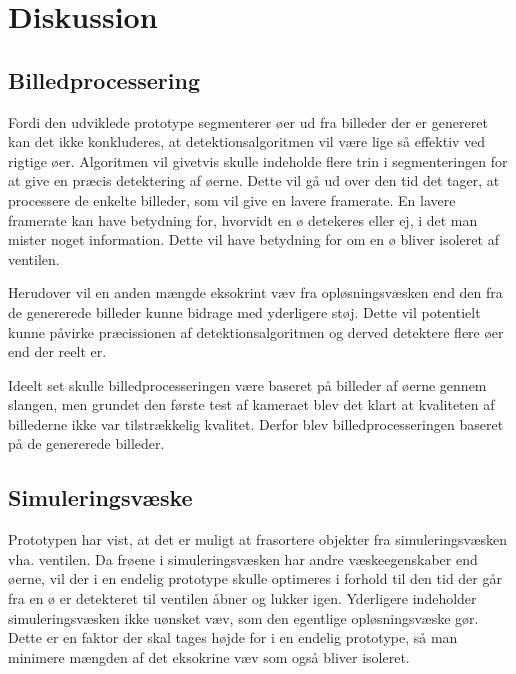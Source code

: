\chapter{Diskussion}

\section{Billedprocessering}
Fordi den udviklede prototype segmenterer øer ud fra billeder der er genereret kan det ikke konkluderes, at detektionsalgoritmen vil være lige så effektiv ved rigtige øer. Algoritmen vil givetvis skulle indeholde flere trin i segmenteringen for at give en præcis detektering af øerne. Dette vil gå ud over den tid det tager, at processere de enkelte billeder, som vil give en lavere framerate. En lavere framerate kan have betydning for, hvorvidt en ø detekeres eller ej, i det man mister noget information. Dette vil have betydning for om en ø bliver isoleret af ventilen.

Herudover vil en anden mængde eksokrint væv fra opløsningsvæsken end den fra de genererede billeder kunne bidrage med yderligere støj. Dette vil potentielt kunne påvirke præcissionen af detektionsalgoritmen og derved detektere flere øer end der reelt er. 

Ideelt set skulle billedprocesseringen være baseret på billeder af øerne gennem slangen, men grundet den første test af kameraet blev det klart at kvaliteten af billederne ikke var tilstrækkelig kvalitet. Derfor blev billedprocesseringen baseret på de genererede billeder. 

\section{Simuleringsvæske}
Prototypen har vist, at det er muligt at frasortere objekter fra simuleringsvæsken vha. ventilen. Da frøene i simuleringsvæsken har andre væskeegenskaber end øerne, vil der i en endelig prototype skulle optimeres i forhold til den tid der går fra en ø er detekteret til ventilen åbner og lukker igen. Yderligere indeholder simuleringsvæsken ikke uønsket væv, som den egentlige opløsningsvæske gør. Dette er en faktor der skal tages højde for i en endelig prototype, så man minimere mængden af det eksokrine væv som også bliver isoleret.


